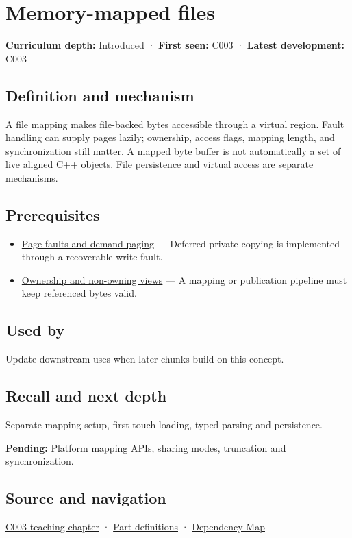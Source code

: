 \hypertarget{appendix-313ee7a0ba7b}{}\label{referencestart:appendix-313ee7a0ba7b}
\section{Memory-mapped files}\label{appendix-313ee7a0ba7b-memory-mapped-files}

\textbf{Curriculum depth:} Introduced · \textbf{First seen:} C003 · \textbf{Latest development:} C003

\subsection{Definition and mechanism}\label{appendix-313ee7a0ba7b-definition-and-mechanism}

A file mapping makes file-backed bytes accessible through a virtual region. Fault handling can supply pages lazily; ownership, access flags, mapping length, and synchronization still matter. A mapped byte buffer is not automatically a set of live aligned C++ objects. File persistence and virtual access are separate mechanisms.

\subsection{Prerequisites}\label{appendix-313ee7a0ba7b-prerequisites}

\begin{itemize}
\tightlist
\item
  \hyperref[appendix-cc0909a7ef14]{Page faults and demand paging} --- Deferred private copying is implemented through a recoverable write fault.
\item
  \hyperref[appendix-d52e4486f527]{Ownership and non-owning views} --- A mapping or publication pipeline must keep referenced bytes valid.
\end{itemize}

\subsection{Used by}\label{appendix-313ee7a0ba7b-used-by}

Update downstream uses when later chunks build on this concept.

\subsection{Recall and next depth}\label{appendix-313ee7a0ba7b-recall-and-next-depth}

Separate mapping setup, first-touch loading, typed parsing and persistence.

\textbf{Pending:} Platform mapping APIs, sharing modes, truncation and synchronization.

\subsection{Source and navigation}\label{appendix-313ee7a0ba7b-source-and-navigation}

\hyperref[01-foundations-i-ch002-where-the-bytes-live]{C003 teaching chapter} · \hyperref[appendix-fd090d982a15-m003---parts-41-60]{Part definitions} · \hyperref[appendix-4ad47bdd269a]{Dependency Map}
